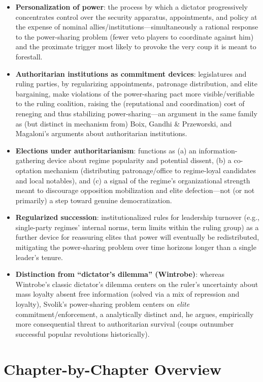 \documentclass[12pt]{article}
\begin{document}
\begin{itemize}[leftmargin=*, itemsep=4pt]
    \item \textbf{Personalization of power}: the process by which a dictator progressively concentrates control over the security apparatus, appointments, and policy at the expense of nominal allies/institutions---simultaneously a rational response to the power-sharing problem (fewer veto players to coordinate against him) and the proximate trigger most likely to provoke the very coup it is meant to forestall.
    \item \textbf{Authoritarian institutions as commitment devices}: legislatures and ruling parties, by regularizing appointments, patronage distribution, and elite bargaining, make violations of the power-sharing pact more visible/verifiable to the ruling coalition, raising the (reputational and coordination) cost of reneging and thus stabilizing power-sharing---an argument in the same family as (but distinct in mechanism from) Boix, Gandhi \& Przeworski, and Magaloni's arguments about authoritarian institutions.
    \item \textbf{Elections under authoritarianism}: functions as (a) an information-gathering device about regime popularity and potential dissent, (b) a co-optation mechanism (distributing patronage/office to regime-loyal candidates and local notables), and (c) a signal of the regime's organizational strength meant to discourage opposition mobilization and elite defection---not (or not primarily) a step toward genuine democratization.
    \item \textbf{Regularized succession}: institutionalized rules for leadership turnover (e.g., single-party regimes' internal norms, term limits within the ruling group) as a further device for reassuring elites that power will eventually be redistributed, mitigating the power-sharing problem over time horizons longer than a single leader's tenure.
    \item \textbf{Distinction from ``dictator's dilemma'' (Wintrobe)}: whereas Wintrobe's classic dictator's dilemma centers on the ruler's uncertainty about mass loyalty absent free information (solved via a mix of repression and loyalty), Svolik's power-sharing problem centers on \emph{elite} commitment/enforcement, a analytically distinct and, he argues, empirically more consequential threat to authoritarian survival (coups outnumber successful popular revolutions historically).
\end{itemize}

\section{Chapter-by-Chapter Overview}
\end{document}
